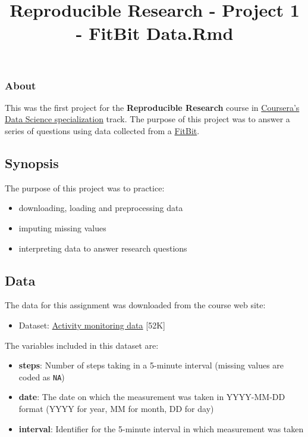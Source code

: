 \documentclass[]{article}
\title{Reproducible Research - Project 1 - FitBit Data.Rmd}
\author{}
\date{}
\providecommand{\tightlist}{%
  \setlength{\itemsep}{0pt}\setlength{\parskip}{0pt}}
\begin{document}
\maketitle

\subsubsection{About}\label{about}

This was the first project for the \textbf{Reproducible Research} course
in
\href{https://www.coursera.org/learn/reproducible-research/home/welcome}{Coursera's
Data Science specialization} track. The purpose of this project was to
answer a series of questions using data collected from a
\href{http://en.wikipedia.org/wiki/Fitbit}{FitBit}.

\subsection{Synopsis}\label{synopsis}

The purpose of this project was to practice:

\begin{itemize}
\tightlist
\item
  downloading, loading and preprocessing data
\item
  imputing missing values
\item
  interpreting data to answer research questions
\end{itemize}

\subsection{Data}\label{data}

The data for this assignment was downloaded from the course web site:

\begin{itemize}
\tightlist
\item
  Dataset:
  \href{https://d396qusza40orc.cloudfront.net/repdata\%2Fdata\%2Factivity.zip}{Activity
  monitoring data} {[}52K{]}
\end{itemize}

The variables included in this dataset are:

\begin{itemize}
\item
  \textbf{steps}: Number of steps taking in a 5-minute interval (missing
  values are coded as \texttt{NA})
\item
  \textbf{date}: The date on which the measurement was taken in
  YYYY-MM-DD format (YYYY for year, MM for month, DD for day)
\item
  \textbf{interval}: Identifier for the 5-minute interval in which
  measurement was taken
\end{itemize}
\end{document}
